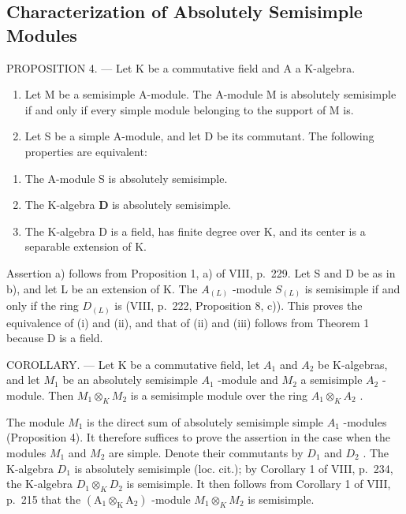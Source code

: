 \subsection{Characterization of Absolutely Semisimple Modules}

PROPOSITION 4. --- Let K be a commutative field and A a K-algebra.

\begin{enumerate}
\def\labelenumi{\alph{enumi})}
\item
  Let M be a semisimple A-module. The A-module M is absolutely semisimple if and only if every simple module belonging to the support of M is.
\item
  Let S be a simple A-module, and let D be its commutant. The following properties are equivalent:
\end{enumerate}

\begin{enumerate}
\def\labelenumi{(\roman{enumi})}
\item
  The A-module S is absolutely semisimple.
\item
  The K-algebra \(\mathbf{D}\) is absolutely semisimple.
\item
  The K-algebra D is a field, has finite degree over K, and its center is a separable extension of K.
\end{enumerate}

Assertion a) follows from Proposition 1, a) of VIII, p.~229. Let S and D be as in b), and let L be an extension of K. The \(A_{(L)}\) -module \(S_{(L)}\) is semisimple if and only if the ring \(D_{(L)}\) is (VIII, p.~222, Proposition 8, c)). This proves the equivalence of (i) and (ii), and that of (ii) and (iii) follows from Theorem 1 because D is a field.

COROLLARY. --- Let K be a commutative field, let \(A_{1}\) and \(A_{2}\) be K-algebras, and let \(M_{1}\) be an absolutely semisimple \(A_{1}\) -module and \(M_{2}\) a semisimple \(A_{2}\) -module. Then \(M_{1} \otimes_{K} M_{2}\) is a semisimple module over the ring \(A_{1} \otimes_{K} A_{2}\) .

The module \(M_{1}\) is the direct sum of absolutely semisimple simple \(A_{1}\) -modules (Proposition 4). It therefore suffices to prove the assertion in the case when the modules \(M_{1}\) and \(M_{2}\) are simple. Denote their commutants by \(D_{1}\) and \(D_{2}\) . The K-algebra \(D_{1}\) is absolutely semisimple (loc. cit.); by Corollary 1 of VIII, p.~234, the K-algebra \(D_{1} \otimes_{K} D_{2}\) is semisimple. It then follows from Corollary 1 of VIII, p.~215 that the \((\mathrm{A}_{1} \otimes_{\mathrm{K}} \mathrm{A}_{2})\) -module \(M_{1} \otimes_{K} M_{2}\) is semisimple.

